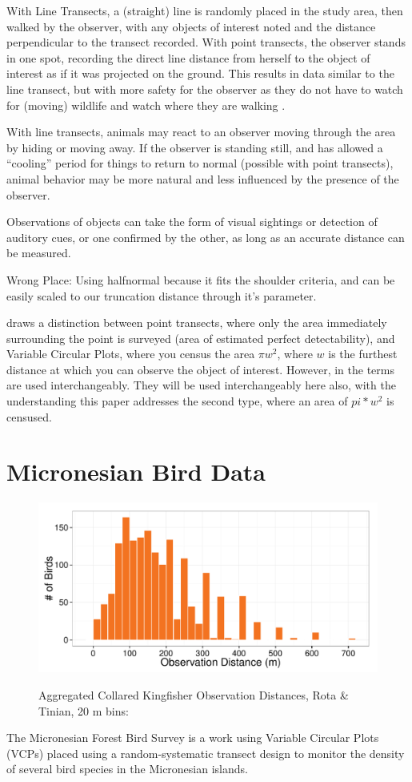 \documentclass[12pt]{article}
\begin{document}
With Line Transects, a (straight) line is randomly placed in the study area, then walked by the observer, with any objects of interest noted and the distance perpendicular to the transect recorded. With point transects, the observer stands in one spot, recording the direct line distance from herself to the object of interest as if it was projected on the ground. This results in data similar to the line transect, but with more safety for the observer as they do not have to watch for (moving) wildlife and watch where they are walking \cite{ramsey1979}.

With line transects, animals may react to an observer moving through the area by hiding or moving away. If the observer is standing still, and has allowed a ``cooling'' period for things to return to normal (possible with point transects), animal behavior may be more natural and less influenced by the presence of the observer.

Observations of objects can take the form of visual sightings or detection of auditory cues, or one confirmed by the other, as long as an accurate distance can be measured.


Wrong Place:  Using halfnormal because it fits the shoulder criteria, and can be easily scaled to our truncation distance through it's parameter.


\textcite[6]{buckland2001} draws a distinction between point transects, where only the area immediately surrounding the point is surveyed (area of estimated perfect detectability), and Variable Circular Plots, where you census the area $\pi w^2$, where $w$ is the furthest distance at which you can observe the object of interest. However, in \textcite{buckland2006, quang1993} the terms are used interchangeably. They will be used interchangeably here also, with the understanding this paper addresses the second type, where an area of $pi*w^2$ is censused.


\section{Micronesian Bird Data}
\begin{figure}
	\caption{Aggregated Collared Kingfisher Observation Distances, Rota \& Tinian, 20 m bins: \cite{micronesian}}
	\includegraphics[width=\textwidth]{../images/histogram_dist_20m.pdf}
	\label{fig:82dist}
\end{figure}
The Micronesian Forest Bird Survey \cite{micronesian} is a work using Variable Circular Plots (VCPs) placed using a random-systematic transect design to monitor the density of several bird species in the Micronesian islands.
\end{document}

